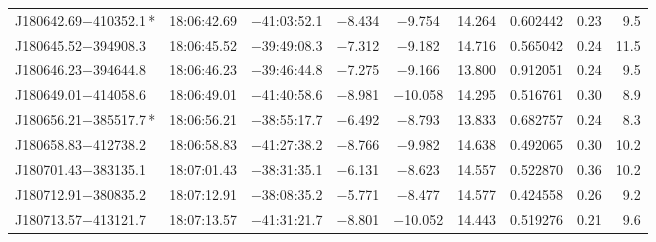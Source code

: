 \begin{table*}
\begin{tabular}{lcccccccr}
J180642.69$-$410352.1\,* & 18:06:42.69 & $-$41:03:52.1 & $-$8.434 & $-$9.754 & 14.264 & 0.602442 & 0.23 & 9.5 \\
J180645.52$-$394908.3 & 18:06:45.52 & $-$39:49:08.3 & $-$7.312 & $-$9.182 & 14.716 & 0.565042 & 0.24 & 11.5 \\
J180646.23$-$394644.8 & 18:06:46.23 & $-$39:46:44.8 & $-$7.275 & $-$9.166 & 13.800 & 0.912051 & 0.24 & 9.5 \\
J180649.01$-$414058.6 & 18:06:49.01 & $-$41:40:58.6 & $-$8.981 & $-$10.058 & 14.295 & 0.516761 & 0.30 & 8.9 \\
J180656.21$-$385517.7\,* & 18:06:56.21 & $-$38:55:17.7 & $-$6.492 & $-$8.793 & 13.833 & 0.682757 & 0.24 & 8.3 \\
J180658.83$-$412738.2 & 18:06:58.83 & $-$41:27:38.2 & $-$8.766 & $-$9.982 & 14.638 & 0.492065 & 0.30 & 10.2 \\
J180701.43$-$383135.1 & 18:07:01.43 & $-$38:31:35.1 & $-$6.131 & $-$8.623 & 14.557 & 0.522870 & 0.36 & 10.2 \\
J180712.91$-$380835.2 & 18:07:12.91 & $-$38:08:35.2 & $-$5.771 & $-$8.477 & 14.577 & 0.424558 & 0.26 & 9.2 \\
J180713.57$-$413121.7 & 18:07:13.57 & $-$41:31:21.7 & $-$8.801 & $-$10.052 & 14.443 & 0.519276 & 0.21 & 9.6 \\
\hline
\end{tabular}
\end{table*}

\addtocounter{table}{-1}

